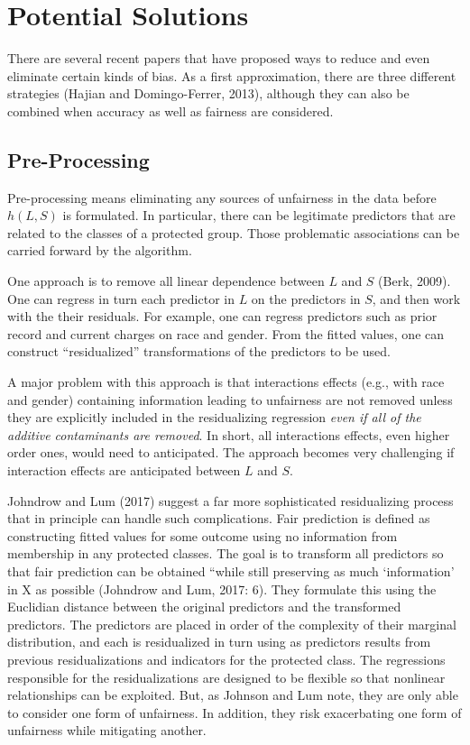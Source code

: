 \documentclass[12pt]{article}
\begin{document}
\section{Potential Solutions}

There are several recent papers that have proposed ways to reduce and even eliminate certain kinds of bias. As a first approximation, there are three different strategies (Hajian and Domingo-Ferrer, 2013), although they can also be combined when accuracy as well as fairness are considered. 

\subsection{Pre-Processing}

Pre-processing means eliminating any sources of unfairness in the data before $h(L,S)$ is formulated. In particular, there can be legitimate predictors that are related to the classes of a protected group. Those problematic associations can be carried forward by the algorithm. 

One approach is to remove all linear dependence between $L$ and $S$ (Berk, 2009). One can regress in turn each predictor in $L$ on the predictors in $S$, and then work with the their residuals. For example, one can regress predictors such as prior record and current charges on race and gender. From the fitted values, one can construct ``residualized'' transformations of the predictors to be used. 

A major problem with this approach is that interactions effects (e.g., with race and gender) containing information leading to unfairness are not removed unless they are explicitly included in the residualizing regression \textit{even if all of the additive contaminants are removed}. In short, all interactions effects, even higher order ones, would need to anticipated. The approach becomes very challenging if interaction effects are anticipated between $L$ and $S$.

Johndrow and Lum (2017) suggest a far more sophisticated residualizing process that in principle can handle such complications. Fair prediction is defined as constructing fitted values for some outcome using no information from membership in any protected classes. The goal is to transform all predictors so that fair prediction can be obtained ``while still preserving as much `information' in X as possible (Johndrow and Lum, 2017: 6). They formulate this using the Euclidian distance between the original predictors and the transformed predictors. The predictors are placed in order of the complexity of their marginal distribution, and each is residualized in turn using as predictors results from previous residualizations and indicators for the protected class. The regressions responsible for the residualizations are designed to be flexible so that nonlinear relationships can be exploited. But, as Johnson and Lum note, they are only able to consider one form of unfairness. In addition, they risk exacerbating one form of unfairness while mitigating another. 
\end{document}
